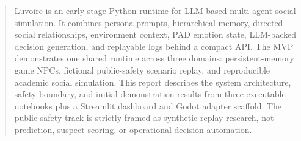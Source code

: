 \begin{abstract}
Luvoire is an early-stage Python runtime for LLM-based multi-agent social simulation. It combines persona prompts, hierarchical memory, directed social relationships, environment context, PAD emotion state, LLM-backed decision generation, and replayable logs behind a compact API. The MVP demonstrates one shared runtime across three domains: persistent-memory game NPCs, fictional public-safety scenario replay, and reproducible academic social simulation. This report describes the system architecture, safety boundary, and initial demonstration results from three executable notebooks plus a Streamlit dashboard and Godot adapter scaffold. The public-safety track is strictly framed as synthetic replay research, not prediction, suspect scoring, or operational decision automation.
\end{abstract}
